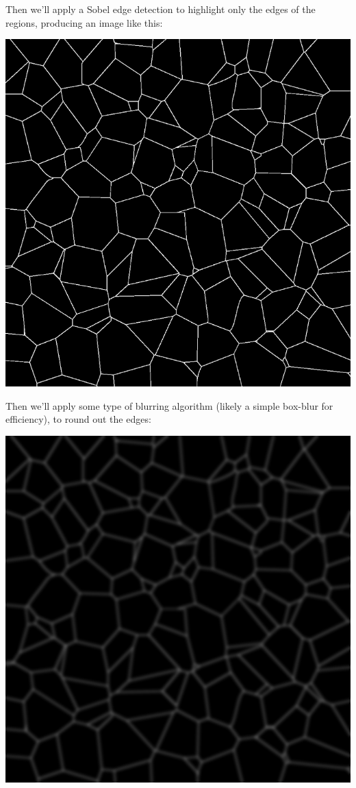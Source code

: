 \documentclass {article}
\begin{document}
\begin{description}
Then we'll apply a Sobel edge detection to highlight only the edges of the regions, producing an image like this:

\includegraphics[scale=0.25]{edges}

Then we'll apply some type of blurring algorithm (likely a simple box-blur for efficiency), to round out the edges:

\includegraphics[scale=0.25]{blurred}


\end{description}
\end{document}
